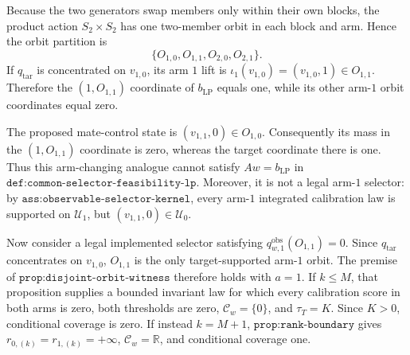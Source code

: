 Because the two generators swap members only within their own blocks, the product action \(S_2\times S_2\) has one two-member orbit in each block and arm. Hence the orbit partition is
\[\{O_{1,0},O_{1,1},O_{2,0},O_{2,1}\}.\]
If \(q_{\mathrm{tar}}\) is concentrated on \(v_{1,0}\), its arm \(1\) lift is \(\iota_1(v_{1,0})=(v_{1,0},1)\in O_{1,1}\). Therefore the \((1,O_{1,1})\) coordinate of \(b_{\mathrm{LP}}\) equals one, while its other arm-\(1\) orbit coordinates equal zero.

The proposed mate-control state is \((v_{1,1},0)\in O_{1,0}\). Consequently its mass in the \((1,O_{1,1})\) coordinate is zero, whereas the target coordinate there is one. Thus this arm-changing analogue cannot satisfy \(Aw=b_{\mathrm{LP}}\) in \(\texttt{def:common-selector-feasibility-lp}\). Moreover, it is not a legal arm-\(1\) selector: by \(\texttt{ass:observable-selector-kernel}\), every arm-\(1\) integrated calibration law is supported on \(\mathcal U_1\), but \((v_{1,1},0)\in\mathcal U_0\).

Now consider a legal implemented selector satisfying \(q^{\mathrm{obs}}_{w,1}(O_{1,1})=0\). Since \(q_{\mathrm{tar}}\) concentrates on \(v_{1,0}\), \(O_{1,1}\) is the only target-supported arm-\(1\) orbit. The premise of \(\texttt{prop:disjoint-orbit-witness}\) therefore holds with \(a=1\). If \(k\le M\), that proposition supplies a bounded invariant law for which every calibration score in both arms is zero, both thresholds are zero, \(\mathcal C_w=\{0\}\), and \(\tau_T=K\). Since \(K>0\), conditional coverage is zero. If instead \(k=M+1\), \(\texttt{prop:rank-boundary}\) gives \(r_{0,(k)}=r_{1,(k)}=+\infty\), \(\mathcal C_w=\mathbb R\), and conditional coverage one.